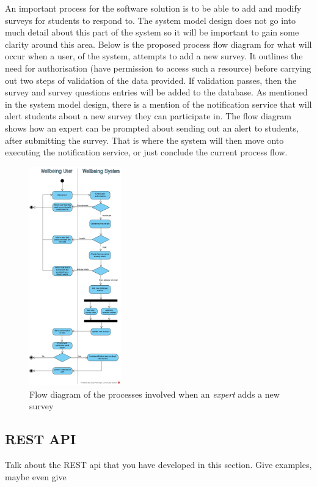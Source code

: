 An important process for the software solution is to be able to add and modify surveys for students to respond to.
The system model design does not go into much detail about this part of the system so it will be important to gain some clarity around this area.
Below is the proposed process flow diagram for what will occur when a user, of the system, attempts to add a new survey.
It outlines the need for authorisation (have permission to access such a resource) before carrying out two steps of validation of the
data provided.
If validation passes, then the survey and survey questions entries will be added to the database.
As mentioned in the system model design, there is a mention of the notification service that will alert students about a new survey they
can participate in.
The flow diagram shows how an expert can be prompted about sending out an alert to students, after submitting the survey.
That is where the system will then move onto executing the notification service, or just conclude the current process flow.

\begin{figure}[ht]
    \centering
    \includegraphics[width=150px]{images/flow_diagram.png}
    \caption{Flow diagram of the processes involved when an \textit{expert} adds a new survey}
\end{figure}

\clearpage

\subsection{REST API}
Talk about the REST api that you have developed in this section.
Give examples, maybe even give 

